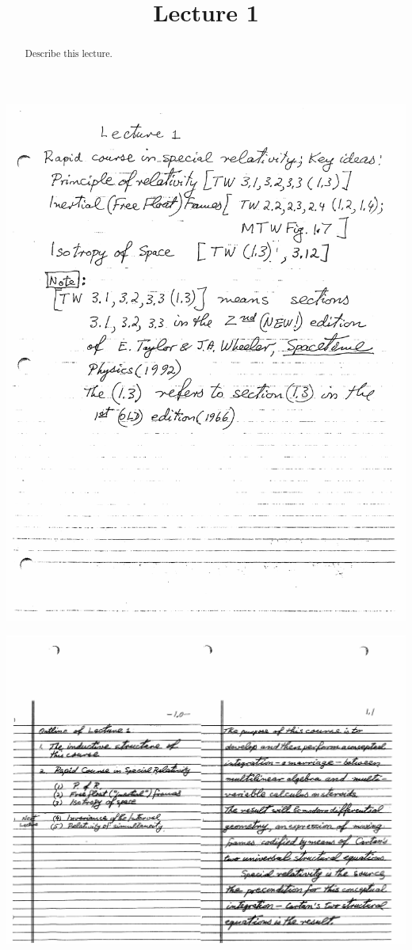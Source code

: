 \documentclass{ximera}
\title{Lecture 1}
\begin{document}
\begin{abstract}
Describe this lecture.
\end{abstract}
\maketitle



\begin{image}
\includegraphics{lecture01-01.pdf}
\end{image}

\begin{image}
\includegraphics{lecture01-02.pdf}
\end{image}
\end{document}
